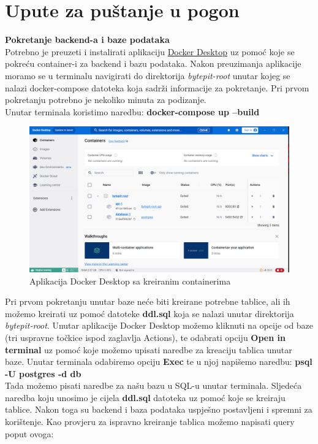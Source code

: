 		\section{Upute za puštanje u pogon}
		
			\textbf{Pokretanje backend-a i baze podataka}\\
			
				\noindent Potrebno je preuzeti i instalirati aplikaciju \href{https://www.docker.com/products/docker-desktop/}{Docker Desktop} uz pomoć koje se pokreću container-i za backend i bazu podataka. Nakon preuzimanja aplikacije moramo se u terminalu navigirati do direktorija \textit{bytepit-root} unutar kojeg se nalazi docker-compose datoteka koja sadrži informacije za pokretanje. Pri prvom pokretanju potrebno je nekoliko minuta za podizanje.\\
				Unutar terminala koristimo naredbu: \textbf{docker-compose up --build}
				\begin{figure}[H]
					\includegraphics[scale=0.45]{slike/docker_desktop.PNG} 
					\centering
					\caption{Aplikacija Docker Desktop sa kreiranim containerima}
					\label{fig:docker_desktop}
				\end{figure}
				\noindent Pri prvom pokretanju unutar baze neće biti kreirane potrebne tablice, ali ih možemo kreirati uz pomoć datoteke \textbf{ddl.sql} koja se nalazi unutar direktorija \textit{bytepit-root}. Unutar aplikacije Docker Desktop možemo kliknuti na opcije od baze (tri uspravne točkice ispod zaglavlja Actions), te odabrati opciju \textbf{Open in terminal} uz pomoć koje možemo upisati naredbe za kreaciju tablica unutar baze. Unutar terminala odabiremo opciju \textbf{Exec} te u njoj napišemo naredbu: \textbf{psql -U postgres -d db}\\
				\eject
				\noindent Tada možemo pisati naredbe za našu bazu u SQL-u unutar terminala. Sljedeća naredba koju unosimo je cijela \textbf{ddl.sql} datoteka uz pomoć koje se kreiraju tablice. Nakon toga su backend i baza podataka uspješno postavljeni i spremni za korištenje. Kao provjeru za ispravno kreiranje tablica možemo napisati query poput ovoga:\\

